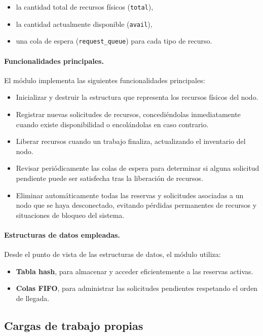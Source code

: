 \documentclass[12pt,a4paper]{article}
\begin{document}
\begin{itemize}
    \item la cantidad total de recursos físicos (\texttt{total}),
    \item la cantidad actualmente disponible (\texttt{avail}),
    \item una cola de espera (\texttt{request\_queue}) para cada tipo de recurso.
\end{itemize}
 
\paragraph{Funcionalidades principales.}
El módulo implementa las siguientes funcionalidades principales:
 
\begin{itemize}
    \item Inicializar y destruir la estructura que representa los recursos físicos del nodo.
    \item Registrar nuevas solicitudes de recursos, concediéndolas inmediatamente cuando existe disponibilidad o encolándolas en caso contrario.
    \item Liberar recursos cuando un trabajo finaliza, actualizando el inventario del nodo.
    \item Revisar periódicamente las colas de espera para determinar si alguna solicitud pendiente puede ser satisfecha tras la liberación de recursos.
    \item Eliminar automáticamente todas las reservas y solicitudes asociadas a un nodo que se haya desconectado, evitando pérdidas permanentes de recursos y situaciones de bloqueo del sistema.
\end{itemize}
 
\paragraph{Estructuras de datos empleadas.}
Desde el punto de vista de las estructuras de datos, el módulo utiliza:
 
\begin{itemize}
    \item \textbf{Tabla hash}, para almacenar y acceder eficientemente a las reservas activas.
    \item \textbf{Colas FIFO}, para administrar las solicitudes pendientes respetando el orden de llegada.
\end{itemize}
 
\subsection{Cargas de trabajo propias}
 
\end{document}
